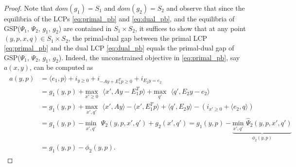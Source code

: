 \documentclass{article} %
\begin{document}
\begin{proof}
Note that $dom(g_1) = S_1$ and $dom(g_2) = S_2$ and observe that since the
equilibria of the LCPs \eqref{eq:primal_pb} and \eqref{eq:dual_pb}, and
the equilibria of GSP($\Psi_1$, $\Psi_2$, $g_1$, $g_2$) are contained
in $S_1 \times S_2$, it suffices to show that at any point $(y, p, x,
q) \in S_1 \times S_2$, the primal-dual gap between the primal
LCP \eqref{eq:primal_pb} and the dual LCP \eqref{eq:dual_pb} equals
the primal-dual gap of GSP($\Psi_1$, $\Psi_2$, $g_1$, $g_2$).
Indeed, the unconstrained objective in \eqref{eq:primal_pb}, say
$a(x,y)$, can be computed as
\begin{eqnarray*}
  \begin{aligned}
    a(y,p) &= \langle e_1,p\rangle + i_{y\ge 0} + i_{-Ay + E_1^Tp \ge 0} +
    i_{E_2y = e_2}\\
    &= g_1(y,p) + \underset{x' \geq
      0}{\text{max}}\text{ }\langle x',Ay - E_1^Tp\rangle +
    \underset{q'}{\text{max}}\text{ }\langle q',E_2y - e_2\rangle\\
    &= g_1(y,p) + \underset{x',
      q'}{\text{max}}\text{ }\langle x',Ay\rangle - \langle x',
    E_1^Tp\rangle + \langle q',E_2y\rangle -
    (i_{x' \ge 0} + \langle e_2,q\rangle)\\
    &= g_1(y,p)
      - \underset{x',q'}{\text{min}}\text{ }\Psi_2(y, p, x', q') + g_2(x',
      q') = g_1(y,p)
      - \underbrace{\underset{x',q'}{\text{min}}\text{
        }\hat{\Psi}_2(y, p, x', q')}_{\phi_2(y,p)}\\
      &= g_1(y, p) - \phi_2(y, p).
  \end{aligned}
  \label{eq:a}
\end{eqnarray*}


\end{proof}
\end{document}
